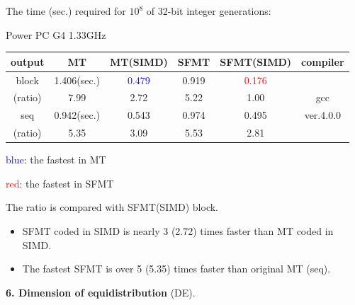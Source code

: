 \documentclass[a4j,12pt,landscape]{jarticle}
\begin{document}
\newpage
\begin{center}
The time (sec.) required for $10^8$ 
of 32-bit integer generations:

Power PC G4 1.33GHz

\vskip 2mm
\begin{tabular}{|c||c|c|c|c|c|}
\hline
output & MT & MT{\Large(SIMD)} & SFMT & SFMT{\Large (SIMD)} & compiler
\\ \hline \hline
block &1.406(sec.) & \textcolor{blue}{0.479}
 & 0.919 & \textcolor{red}{0.176} & \phantom{intel C/C++}\\ \cline{2-5}
(ratio)& 7.99\phantom{0} & 2.72\phantom{0}  & 5.22\phantom{0} & 1.00\phantom{0} & gcc \\ \cline{1-5}
 seq & 0.942(sec.) & 0.543 & 0.974 & 0.495 & ver.4.0.0 \\ \cline{2-5}
(ratio)& 5.35\phantom{0} & 3.09\phantom{0} & 5.53\phantom{0} & 2.81\phantom{0} & \\ \hline
\end{tabular}
\end{center}
\textcolor{blue}{blue}: the fastest in MT

\textcolor{red}{red}: the fastest in SFMT

The ratio is compared with SFMT(SIMD) block.
\begin{itemize}
  \item SFMT coded in SIMD is nearly 3 (2.72) times faster than MT
 coded in SIMD.
  \item The fastest SFMT is over 5 (5.35) times faster than original MT (seq).
\end{itemize}

\newpage
\noindent
{\bf 6. Dimension of equidistribution} (DE).
\end{document}
